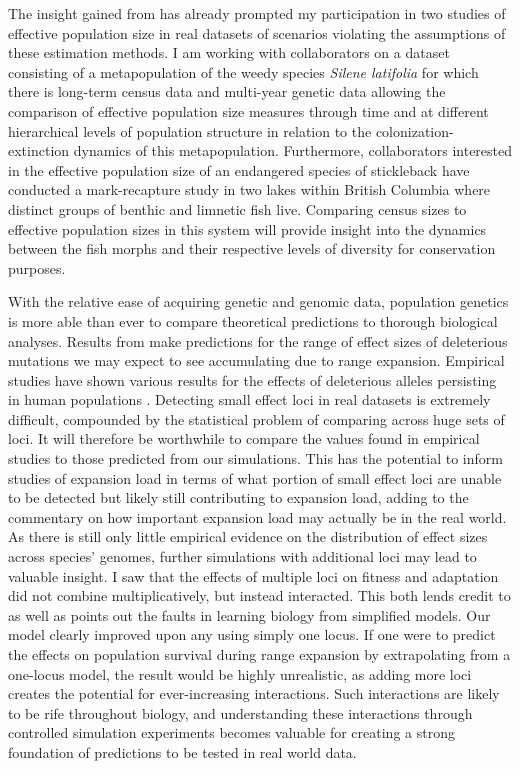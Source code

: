 The insight gained from  has already prompted my participation in two studies of effective population size in real datasets of scenarios violating the assumptions of these estimation methods. I am working with collaborators on a dataset consisting of a metapopulation of the weedy species \emph{Silene latifolia} for which there is long-term census data and multi-year genetic data allowing the comparison of effective population size measures through time and at different hierarchical levels of population structure in relation to the colonization-extinction dynamics of this metapopulation. Furthermore, collaborators interested in the effective population size of an endangered species of stickleback have conducted a mark-recapture study in two lakes within British Columbia where distinct groups of benthic and limnetic fish live. Comparing census sizes to effective population sizes in this system will provide insight into the dynamics between the fish morphs and their respective levels of diversity for conservation purposes.

With the relative ease of acquiring genetic and genomic data, population genetics is more able than ever to compare theoretical predictions to thorough biological analyses. Results from  make predictions for the range of effect sizes of deleterious mutations we may expect to see accumulating due to range expansion. Empirical studies have shown various results for the effects of deleterious alleles persisting in human populations \citep{Henn:2015, Lohmueller:2008, Do:2015}. Detecting small effect loci in real datasets is extremely difficult, compounded by the statistical problem of comparing across huge sets of loci. It will therefore be worthwhile to compare the values found in empirical studies to those predicted from our simulations. This has the potential to inform studies of expansion load in terms of what portion of small effect loci are unable to be detected but likely still contributing to expansion load, adding to the commentary on how important expansion load may actually be in the real world. As there is still only little empirical evidence on the distribution of effect sizes across species' genomes, further simulations with additional loci may lead to valuable insight. I saw that the effects of multiple loci on fitness and adaptation did not combine multiplicatively, but instead interacted. This both lends credit to as well as points out the faults in learning biology from simplified models. Our model clearly improved upon any using simply one locus. If one were to predict the effects on population survival during range expansion by extrapolating from a one-locus model, the result would be highly unrealistic, as adding more loci creates the potential for ever-increasing interactions. Such interactions are likely to be rife throughout biology, and understanding these interactions through controlled simulation experiments becomes valuable for creating a strong foundation of predictions to be tested in real world data. 

